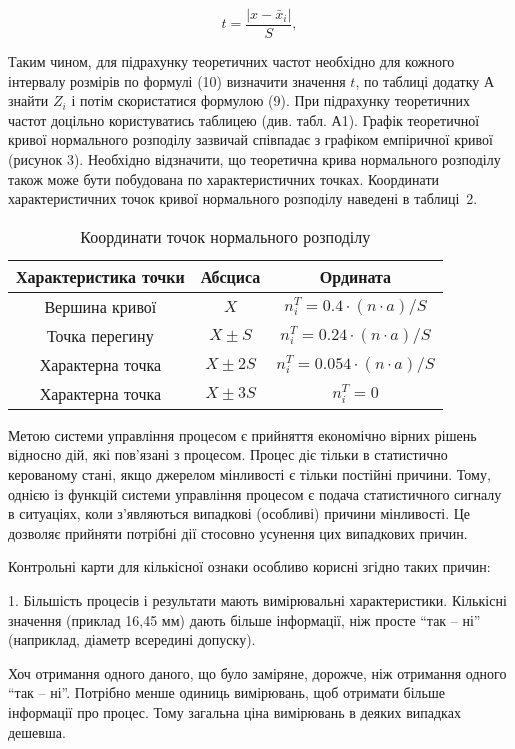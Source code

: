 \[
t = \frac{|x - \bar{x}_i|}{S}, \tag{3.10}
\]

Таким чином, для підрахунку теоретичних частот необхідно для кожного інтервалу розмірів по формулі (10) визначити значення $t$, по таблиці додатку А знайти $Z_i$ і потім скористатися формулою (9). При підрахунку теоретичних частот доцільно користуватись таблицею (див. табл. А1). Графік теоретичної кривої нормального розподілу зазвичай співпадає з графіком емпіричної кривої (рисунок 3).
Необхідно відзначити, що теоретична крива нормального розподілу також може бути побудована по характеристичних точках. Координати характеристичних точок кривої нормального розподілу наведені в таблиці~2.

\begin{table}[H]
\centering
\caption{Координати точок нормального розподілу}
\begin{tabular}{|c|c|c|}
\hline
Характеристика точки & Абсциса & Ордината \\
\hline
Вершина кривої & $X$ & $n_i^T = 0.4 \cdot (n \cdot a) / S$ \\
\hline
Точка перегину & $X \pm S$ & $n_i^T = 0.24 \cdot (n \cdot a) / S$ \\
\hline
Характерна точка & $X \pm 2S$ & $n_i^T = 0.054 \cdot (n \cdot a) / S$ \\
\hline
Характерна точка & $X \pm 3S$ & $n_i^T = 0$ \\
\hline
\end{tabular}
\end{table}

Метою системи управління процесом є прийняття економічно вірних рішень відносно дій, які пов'язані з процесом. Процес діє тільки в статистично керованому стані, якщо джерелом мінливості є тільки постійні причини. Тому, однією із функцій системи управління процесом є подача статистичного сигналу в ситуаціях, коли з'являються випадкові (особливі) причини мінливості. Це дозволяє прийняти потрібні дії стосовно усунення цих випадкових причин.

Контрольні карти для кількісної ознаки особливо корисні згідно таких причин:

1. Більшість процесів і результати мають вимірювальні характеристики. Кількісні значення (приклад 16{,}45 мм) дають більше інформації, ніж просте ``так -- ні'' (наприклад, діаметр всередині допуску).

Хоч отримання одного даного, що було заміряне, дорожче, ніж отримання одного ``так -- ні''. Потрібно менше одиниць вимірювань, щоб отримати більше інформації про процес. Тому загальна ціна вимірювань в деяких випадках дешевша.

